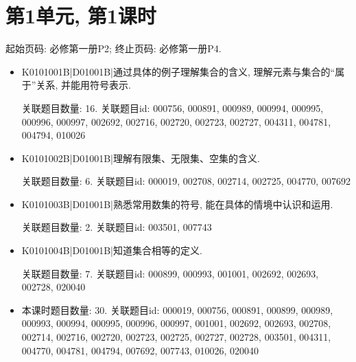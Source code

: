 \section*{第1单元, 第1课时}
起始页码: 必修第一册P2; 终止页码: 必修第一册P4.
\begin{itemize}
\item K0101001B|D01001B|通过具体的例子理解集合的含义, 理解元素与集合的``属于''关系, 并能用符号表示.

关联题目数量: 16. 关联题目id: 000756, 000891, 000989, 000994, 000995, 000996, 000997, 002692, 002716, 002720, 002723, 002727, 004311, 004781, 004794, 010026

\item K0101002B|D01001B|理解有限集、无限集、空集的含义.

关联题目数量: 6. 关联题目id: 000019, 002708, 002714, 002725, 004770, 007692

\item K0101003B|D01001B|熟悉常用数集的符号, 能在具体的情境中认识和运用.

关联题目数量: 2. 关联题目id: 003501, 007743

\item K0101004B|D01001B|知道集合相等的定义.

关联题目数量: 7. 关联题目id: 000899, 000993, 001001, 002692, 002693, 002728, 020040

\item 本课时题目数量: 30. 关联题目id: 000019, 000756, 000891, 000899, 000989, 000993, 000994, 000995, 000996, 000997, 001001, 002692, 002693, 002708, 002714, 002716, 002720, 002723, 002725, 002727, 002728, 003501, 004311, 004770, 004781, 004794, 007692, 007743, 010026, 020040

\end{itemize}

